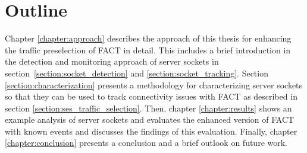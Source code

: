 \section{Outline
\label{sec:outline}}
Chapter \ref{chapter:approach} describes the approach of this thesis for enhancing the traffic preselection of FACT in detail. This includes a brief introduction in the detection and monitoring approach of server sockets in section \ref{section:socket_detection} and \ref{section:socket_tracking}. Section \ref{section:characterization} presents a methodology for characterizing server sockets so that they can be used to track connectivity issues with FACT as described in section \ref{section:ses_traffic_selection}.
Then, chapter \ref{chapter:results} shows an example analysis of server sockets and evaluates the enhanced version of FACT with known events and discusses the findings of this evaluation. Finally, chapter \ref{chapter:conclusion} presents a conclusion and a brief outlook on future work.

